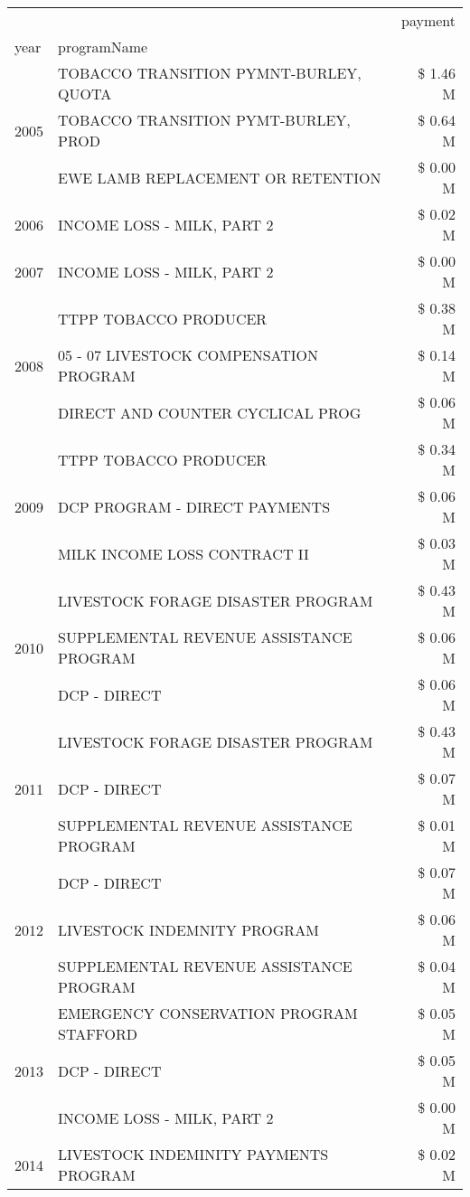 \begin{tabular}{llr}
\toprule
 &  & payment \\
year & programName &  \\
\midrule
\multirow[t]{3}{*}{2005} & TOBACCO TRANSITION PYMNT-BURLEY, QUOTA & \$ 1.46 M \\
 & TOBACCO TRANSITION PYMT-BURLEY, PROD & \$ 0.64 M \\
 & EWE LAMB REPLACEMENT OR RETENTION & \$ 0.00 M \\
\cline{1-3}
2006 & INCOME LOSS - MILK, PART 2 & \$ 0.02 M \\
\cline{1-3}
2007 & INCOME LOSS - MILK, PART 2 & \$ 0.00 M \\
\cline{1-3}
\multirow[t]{3}{*}{2008} & TTPP TOBACCO PRODUCER & \$ 0.38 M \\
 & 05 - 07 LIVESTOCK COMPENSATION PROGRAM & \$ 0.14 M \\
 & DIRECT AND COUNTER CYCLICAL PROG & \$ 0.06 M \\
\cline{1-3}
\multirow[t]{3}{*}{2009} & TTPP TOBACCO PRODUCER & \$ 0.34 M \\
 & DCP PROGRAM - DIRECT PAYMENTS & \$ 0.06 M \\
 & MILK INCOME LOSS CONTRACT II & \$ 0.03 M \\
\cline{1-3}
\multirow[t]{3}{*}{2010} & LIVESTOCK FORAGE DISASTER PROGRAM & \$ 0.43 M \\
 & SUPPLEMENTAL REVENUE ASSISTANCE PROGRAM & \$ 0.06 M \\
 & DCP - DIRECT & \$ 0.06 M \\
\cline{1-3}
\multirow[t]{3}{*}{2011} & LIVESTOCK FORAGE DISASTER PROGRAM & \$ 0.43 M \\
 & DCP - DIRECT & \$ 0.07 M \\
 & SUPPLEMENTAL REVENUE ASSISTANCE PROGRAM & \$ 0.01 M \\
\cline{1-3}
\multirow[t]{3}{*}{2012} & DCP - DIRECT & \$ 0.07 M \\
 & LIVESTOCK INDEMNITY PROGRAM & \$ 0.06 M \\
 & SUPPLEMENTAL REVENUE ASSISTANCE PROGRAM & \$ 0.04 M \\
\cline{1-3}
\multirow[t]{3}{*}{2013} & EMERGENCY CONSERVATION PROGRAM STAFFORD & \$ 0.05 M \\
 & DCP - DIRECT & \$ 0.05 M \\
 & INCOME LOSS - MILK, PART 2 & \$ 0.00 M \\
\cline{1-3}
\multirow[t]{3}{*}{2014} & LIVESTOCK INDEMINITY PAYMENTS PROGRAM & \$ 0.02 M \\

\end{tabular}
